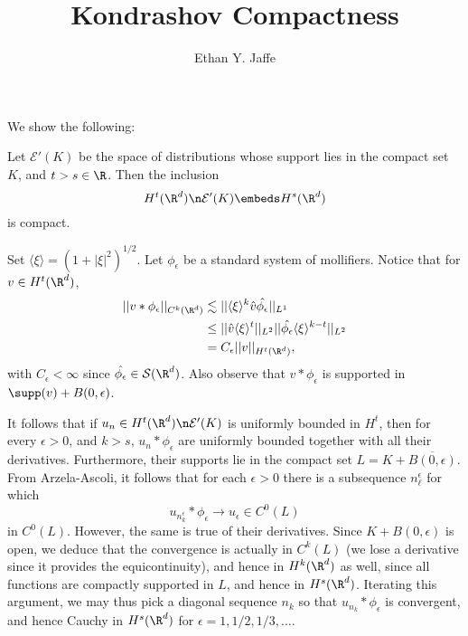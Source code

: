 \documentclass[12pt]{article}
\title{Kondrashov Compactness}
\author{Ethan Y. Jaffe}
\date{}
\begin{document}
\maketitle
\setcounter{section}{1}
We show the following:
\begin{thm}Let $\mathcal E'(K)$ be the space of distributions whose support lies in the compact set $K$, and $t > s \in \R$. Then the inclusion
\[H^t(\R^d)\n \mathcal E'(K) \embeds H^s(\R^d)\] is compact.\end{thm}
Set $\langle \xi \rangle = (1+|\xi|^2)^{1/2}$.
Let $\phi_\epsilon$ be a standard system of mollifiers. Notice that for $v \in H^t(\R^d)$,
\begin{align*}
||v\ast \phi_\epsilon||_{C^k(\R^d)} &\lesssim ||\langle \xi \rangle^{k}\hat{v}\hat{\phi_\epsilon}||_{L^1}\\
&\leq ||\hat{v}\langle \xi \rangle^t||_{L^2}||\hat{\phi_\epsilon}\langle \xi \rangle^{k-t}||_{L^2}\\
&= C_\epsilon||v||_{H^t(\R^d)},\end{align*}
with $C_\epsilon < \infty$  since $\hat{\phi_\epsilon} \in \mathcal S(\R^d)$. Also observe that $v\ast \phi_\epsilon$ is supported in $\supp(v)+B(0,\epsilon)$.

It follows that if $u_n \in H^t(\R^d)\n\mathcal E'(K)$ is uniformly bounded in $H^t$, then for every $\epsilon > 0$, and $k > s$, $u_n\ast\phi_\epsilon$ are uniformly bounded together with all their derivatives. Furthermore, their supports lie in the compact set $L =K+\overline{B(0,\epsilon)}$. From Arzela-Ascoli, it follows that for each $\epsilon > 0$ there is a subsequence $n_\ell^\epsilon$ for which
 \[u_{n_k^\epsilon}\ast\phi_\epsilon \to u_\epsilon \in C^0(L)\] in $C^0(L)$. However, the same is true of their derivatives. Since $K+B(0,\epsilon)$ is open, we deduce that the convergence is actually in $C^k(L)$ (we lose a derivative since it provides the equicontinuity), and hence in $H^k(\R^d)$ as well, since all functions are compactly supported in $L$, and hence in $H^s(\R^d)$. Iterating this argument, we may thus pick a diagonal sequence $n_k$ so that $u_{n_k}\ast\phi_{\epsilon}$ is convergent, and hence Cauchy in $H^s(\R^d)$ for $\epsilon = 1,1/2,1/3,\ldots$.
 
\end{document}

